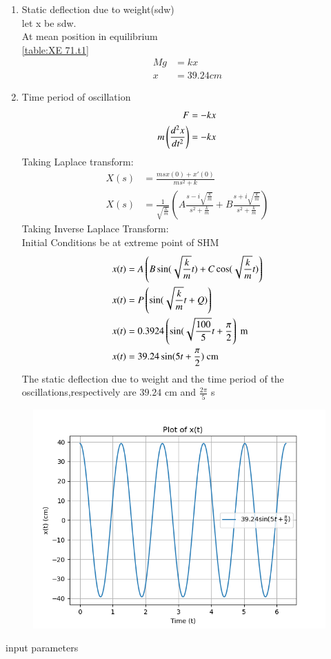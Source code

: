 \documentclass[journal,12pt,twocolumn]{IEEEtran}
\theoremstyle{remark}
\begin{document}
\begin{enumerate}
    \item Static deflection due to weight(sdw)\\
    let x be sdw.\\
    At mean position in equilibrium\\
     \ref{table:XE 71.t1}
    \begin{align}
        Mg&=kx\\
        x&=39.24cm
    \end{align}
     \item Time period of oscillation\\
     \begin{align}
           F&=-kx\\
           m\left(\frac{d^2x}{dt^2}\right) &=-kx
     \end{align}
     Taking Laplace transform:
     \begin{align}
      X(s) &= \frac{ms x(0) + x'(0)}{ms^2 + k} \\
       X(s) &= \frac{1}{\sqrt{\frac{k}{m}}} \left( A \frac{s - i \sqrt{\frac{k}{m}}}{s^2 + \frac{k}{m}} + B \frac{s + i \sqrt{\frac{k}{m}}}{s^2 + \frac{k}{m}} \right) 
     \end{align}
     Taking Inverse Laplace Transform:\\
     Initial Conditions be at extreme point of SHM
     \begin{align}
      x(t) &=A \left( B \sin(\sqrt{\frac{k}{m}}t) + C\cos(\sqrt{\frac{k}{m}}t) \right)\\
       x(t) &=P \left(\sin(\sqrt{\frac{k}{m}}t+Q) \right)\\
      x(t)&=0.3924\left(\sin(\sqrt{\frac{100}{5}}t+\frac{\pi}{2}\right)\text{ m}\\
      x(t)&=39.24 \sin(5t+\frac{\pi}{2}) \text{ cm}
     \end{align}
    The static deflection due to weight and the time period of the oscillations,respectively are $39.24$ cm and $\frac{2\pi}{5}$ s
\end{enumerate}
 \begin{figure}[h!]
    \centering
    \includegraphics[width = \columnwidth]{figs/xe_71_f2.png}
\end{figure}
 \begin{table}[!ht]
    \centering
        
    \caption{input parameters}
     \label{XE 71.t1}
\end{table}
\end{document}
